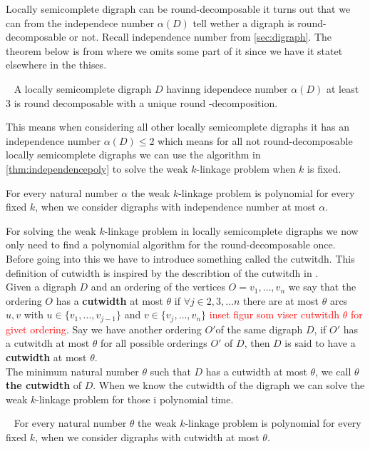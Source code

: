 Locally semicomplete digraph can be round-decomposable it turns out that we can from the independece number $\alpha (D)$ tell wether a digraph is round-decomposable or not.
Recall independence number from \autoref{sec:digraph}. The theorem below is from \cite{bangJGT77} where we omits some part of it since we have it statet elsewhere in the thises.
\begin{thm}~\cite{bangJGT77}
    A locally semicomplete digraph $D$ havinng idependece number $\alpha (D)$ at least 3 is round decomposable with a unique round -decomposition. 
    \label{thm:independenceround}
\end{thm} 
This means when considering all other locally semicomplete digraphs it has an independence number $\alpha (D) \leq 2$ which means for all not round-decomposable locally semicomplete digraphs we can use the algorithm in \autoref{thm:independencepoly} to solve the weak $k$-linkage problem when $k$ is fixed.
\begin{thm}
        For every natural number $\alpha$ the weak $k$-linkage problem is polynomial for every fixed $k$, when we consider digraphs with independence number at most $\alpha$.
    \label{thm:independencepoly}
\end{thm}
For solving the weak $k$-linkage problem in locally semicomplete digraphs we now only need to find a polynomial algorithm for the round-decomposable once.
Before going into this we have to introduce something called the cutwitdh. This definition of cutwidth is inspired by the describtion of the cutwitdh in \cite{bangJGT77}.\\
Given a digraph $D$ and an ordering of the vertices $O=v_1,\dots,v_n$ we say that the ordering $O$ has a \textbf{cutwidth} at most $\theta$ if $\forall j\in {2,3, \dots n}$ there are at most $\theta$ arcs $u,v$ with $u\in \lbrace v_1,\dots ,v_{j-1}\rbrace$ and $v\in \lbrace v_j,\dots ,v_n\rbrace$ 
\textcolor{red}{inset figur som viser cutwitdh $\theta$ for givet ordering}.
Say we have another ordering $O'$of the same digraph $D$, if $O'$ has a cutwitdh at most $\theta$ for all possible orderings $O'$ of $D$, then $D$ is said to have a \textbf{cutwidth} at most $\theta$. \\
The minimum natural number $\theta$ such that $D$ has a cutwidth at most $\theta$, we call $\theta$ \textbf{the cutwidth} of $D$.
When we know the cutwidth of the digraph we can solve the weak $k$-linkage problem for those i polynomial time.
\begin{thm}~\cite{bangJGT77}
    For every natural number $\theta$ the weak $k$-linkage problem is polynomial for every fixed $k$, when we consider digraphs with cutwidth at most $\theta$.
\end{thm}
